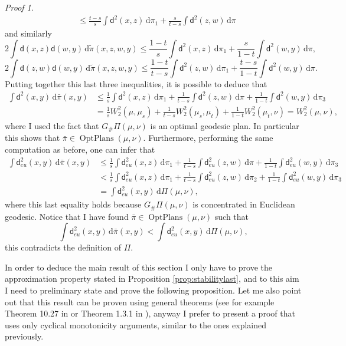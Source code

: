 \documentclass[11pt,twoside,a4paper]{article}
\newcommand{\de}{\ensuremath{\, \mathrm d}} %
\newcommand{\thmsymbol}{\( \square \)}
\newcommand{\di}{\mathsf d} %
\DeclareMathOperator{\OptPlans}{OptPlans}
\theoremstyle{theorem}
\theoremstyle{definition}
\theoremstyle{remark}
\theoremstyle{proof}
\newtheorem*{pro}{Proof}
\newenvironment{pr}{\begin{pro}%
 \renewcommand{\qedsymbol}{\thmsymbol}\pushQED{\qed}}%
 {\popQED\end{pro}}
\begin{document}
\begin{pr}
\begin{align*}
     &\leq \frac{t-s}{s} \int \di^2 (x,z)  \de \pi_1 + \frac{s}{t-s} \int \di^2 (z,w)  \de \pi 
 \end{align*}
 and similarly 
 \begin{equation*}
     2 \int \di(x,z) \di(w,y)\de \tilde \pi (x,z,w,y) \leq \frac{1-t}{s} \int \di^2 (x,z)  \de \pi_1 + \frac{s}{1-t} \int \di^2 (w,y)  \de \pi,
 \end{equation*}
 \begin{equation*}
     2 \int \di(z,w) \di(w,y)\de \tilde \pi (x,z,w,y) \leq \frac{1-t}{t-s} \int \di^2 (z,w)  \de \pi_1 + \frac{t-s}{1-t} \int \di^2 (w,y)  \de \pi.
 \end{equation*}
 Putting together this last three inequalities, it is possible to deduce that 
 \begin{align*}
     \int \di^2(x,y) \de \bar \pi (x,y) &\leq \frac{1}{s}  \int \di^2 (x,z)  \de \pi_1 + \frac{1}{t-s}  \int \di^2 (z,w)  \de \pi + \frac{1}{1-t}  \int \di^2 (w,y)  \de \pi_3 \\
     &= \frac 1s W_2^2(\mu,\mu_s) + \frac{1}{t-s} W_2^2(\mu_s,\mu_t) + \frac{1}{1-t} W_2^2 (\mu_t,\nu) = W_2^2(\mu,\nu),
 \end{align*}
 where I used the fact that $G_\# \Pi(\mu,\nu)$ is an optimal geodesic plan. In particular this shows that $\bar \pi \in \OptPlans(\mu,\nu)$. Furthermore, performing the same computation as before, one can infer that 
  \begin{align*}
     \int \di_{eu}^2(x,y) \de \bar \pi (x,y) &\leq \frac{1}{s}  \int \di_{eu}^2 (x,z)  \de \pi_1 + \frac{1}{t-s}  \int \di_{eu}^2 (z,w)  \de \pi + \frac{1}{1-t}  \int \di_{eu}^2 (w,y)  \de \pi_3 \\
     &< \frac{1}{s}  \int \di_{eu}^2 (x,z)  \de \pi_1 + \frac{1}{t-s}  \int \di_{eu}^2 (z,w)  \de \pi_2 + \frac{1}{1-t}  \int \di_{eu}^2 (w,y)  \de \pi_3 \\
     &= \int \di_{eu}^2(x,y) \de \Pi(\mu,\nu),
 \end{align*}
 where this last equality holds because $G_\# \Pi(\mu,\nu)$ is concentrated in Euclidean geodesic. Notice that I have found $\bar \pi \in \OptPlans(\mu,\nu)$ such that
 \begin{equation*}
     \int \di_{eu}^2(x,y) \de \bar \pi (x,y) < \int \di_{eu}^2(x,y) \de \Pi(\mu,\nu),
 \end{equation*}
 this contradicts the definition of $\Pi$.
 \end{pr}


In order to deduce the main result of this section I only have to prove the approximation property stated in Proposition \ref{prop:stabilitylast}, and to this aim I need to preliminary state and prove the following proposition. Let me also point out that this result can be proven using general theorems (see for example Theorem 10.27 in \cite{villani2008} or Theorem 1.3.1 in \cite{Figalli2010OptimalTA}), anyway I prefer to present a proof that uses only cyclical monotonicity arguments, similar to the ones explained previously.
\end{document}
